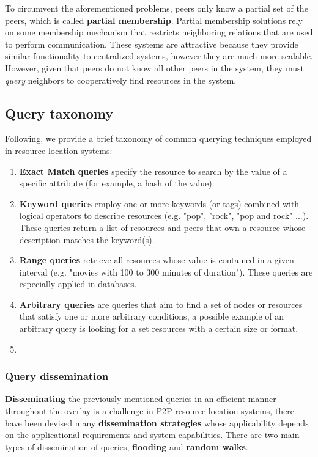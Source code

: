 To circumvent the aforementioned problems, peers only know a partial set of the peers, which is called \textbf{partial membership}. Partial membership solutions rely on some membership mechanism that restricts neighboring relations that are used to perform communication. These systems are attractive because they provide similar functionality to centralized systems, however they are much more scalable. However, given that peers do not know all other peers in the system, they must \textit{query} neighbors to cooperatively find resources in the system. 

\subsection{Query taxonomy}

Following, we provide a brief taxonomy of common querying techniques employed in resource location systems:

\begin{enumerate}
    \item \textbf{Exact Match queries} specify the resource to search by the value of a specific attribute (for example, a hash of the value).

    \item \textbf{Keyword queries} employ one or more keywords (or tags) combined with logical operators to describe resources (e.g. "pop", "rock", "pop and rock" ...). These queries return a list of resources and peers that own a resource whose description matches the keyword(s).
    
    \item \textbf{Range queries} retrieve all resources whose value is contained in a given interval (e.g. "movies with 100 to 300 minutes of duration"). These queries are especially applied in databases.
    
    \item \textbf{Arbitrary queries} are queries that aim to find a set of nodes or resources that satisfy one or more arbitrary conditions, a possible example of an arbitrary query is looking for a set resources with a certain size or format.
    \item 
\end{enumerate}

\subsubsection{Query dissemination}

\textbf{Disseminating} the previously mentioned queries in an efficient manner throughout the overlay is a challenge in P2P resource location systems, there have been devised many \textbf{dissemination strategies} whose applicability depends on the applicational requirements and system capabilities. There are two main types of dissemination of queries, \textbf{flooding} and \textbf{random walks}.

